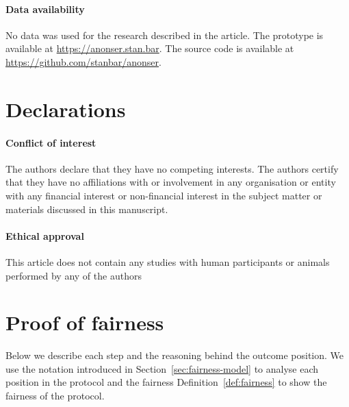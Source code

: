 \documentclass[pdftex,twocolumn,epjc3]{svjour3}
\renewcommand{\sp}{SP}
\begin{document}
{\paragraph{Data availability}
No data was used for the research described in the article.
The prototype is available at \url{https://anonser.stan.bar}. 
The source code is available at \url{https://github.com/stanbar/anonser}.

\section*{Declarations}

\paragraph{Conflict of interest} The authors declare that they have no competing interests. The authors certify that they have no affiliations with or involvement in any organisation or entity with any financial interest or non-financial interest in the subject matter or materials discussed in this manuscript.

\paragraph{Ethical approval} This article does not contain any studies with human participants or animals performed by any of the authors


\appendix

\section{Proof of fairness}\label{app:proof-of-fairness}
Below we describe each step and the reasoning behind the outcome position.
We use the notation introduced in Section~\ref{sec:fairness-model} to analyse each position in the protocol and the fairness Definition~\ref{def:fairness} to show the fairness of the protocol.

\newcommand{\AgreeablePath}{Agreeable path:}
\newcommand{\DisputePath}{The customer starts a dispute:}
\newcommand{\Fairness}{Fairness:}
\newcommand{\CustomerTurn}[0]{\expandafter\MakeUppercase customer turn:}
\newcommand{\SPTurn}[0]{\sp{} turn:}

\newcommand{\CanFollowToOne}[2]{The #1 can follow the protocol to the non-disadvantaged position #2}
\newcommand{\CanDoNothing}[1]{The #1 can do nothing and always ends up in the non-disadvantaged position}
\newcommand{\CanDoAnything}[1]{The #1 can do anything and always ends up in the non-disadvantaged position}
\newcommand{\Pos}[4]{$\operatorname{\sigma_{#1, #2, #3} = #4}$}
\newcommand{\WinForTheSameReason}[1]{The #1 wins the dispute for the same reason}
\newcommand{\LoseForTheSameReason}[1]{The #1 loses the dispute for the same reason}
\newcommand{\ActedAbnormallyThen}[1]{The #1 acted abnormally, then:}
\newcommand{\CustomerPaidButDidntGetResult}{The customer ends up in a disadvantageous position, because he has paid in advance, but hasn't received the result}
\newcommand{\SpReceivedThePayment}{The SP ends up in the advantageous position, having received the payment}

}
\end{document}
